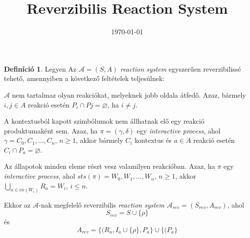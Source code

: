 \documentclass[12pt]{article}
\title{Reverzibilis Reaction System}
\date{\today}
\theoremstyle{definition}
\newtheorem*{definition*}{Definíció}
\newenvironment{outdentlist}
  {\begin{list}{}{\setlength\itemindent{-\leftmargin}}}
  {\end{list}}
\let\emptyset\varnothing
\begin{document}
    \maketitle
    \begin{definition*}
    Legyen Az $\mathcal{A} = (S, A)$ \textit{reaction system} egyszerűen reverzibilissé tehető, amennyiben a következő feltételek teljesülnek:

        \begin{outdentlist}
            \item
            $\mathcal{A}$ nem tartalmaz olyan reakciókat, melyeknek jobb oldala átfedő. Azaz, bármely $i, j \in A$ reakció esetén $P_{i} \cap P{j} = \emptyset$, ha $i \neq j$.

            \item
            A kontextusból kapott szimbólumok nem állhatnak elő egy reakció produktumaként sem. Azaz, ha $\pi = (\gamma, \delta)$ egy \textit{interactive process}, ahol $\gamma = C_{0}, C_{1}, \ldots, C_{n}$, $n \geq 1$, akkor bármely $C_{i}$ kontextus és $a \in A$ reakció esetén $C_{i} \cap P_{a} = \emptyset$.

            \item
            Az állapotok minden eleme részt vesz valamilyen reakcióban. Azaz, ha $\pi$ egy \textit{interactive process}, ahol $\textit{sts}(\pi) = W_{0}, W_{1}, \ldots, W_{n}$, $n \geq 1$, akkor $\bigcup_{a \in \textit{en}(W_{i})} R_{a} = W_{i}$, $i \leq n$.
        \end{outdentlist}

    Ekkor az $\mathcal{A}$-nak megfelelő reverzibilis \textit{reaction system} $\mathcal{A}_{\textit{rev}} = (S_{\textit{rev}}, A_{\textit{rev}})$, ahol
        $$
        S_{\textit{rev}} = S \cup \{\rho\}
        $$
    és
        $$
        A_{\textit{rev}} = 
            \{ (R_{a}, I_{a} \cup \{ \rho \}, P_{a} \} 
            \cup 
            \{ (P_{a}\}
        $$
    \end{definition*}
\end{document}
